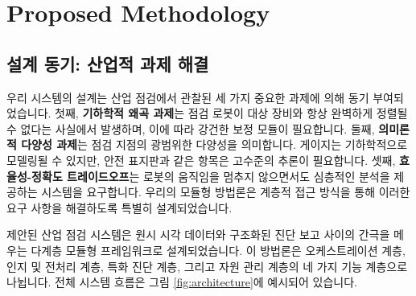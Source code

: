 \section{Proposed Methodology}
\label{sec:methodology}

\subsection{설계 동기: 산업적 과제 해결}
우리 시스템의 설계는 산업 점검에서 관찰된 세 가지 중요한 과제에 의해 동기 부여되었습니다.
첫째, \textbf{기하학적 왜곡 과제}는 점검 로봇이 대상 장비와 항상 완벽하게 정렬될 수 없다는 사실에서 발생하며, 이에 따라 강건한 보정 모듈이 필요합니다.
둘째, \textbf{의미론적 다양성 과제}는 점검 지점의 광범위한 다양성을 의미합니다. 게이지는 기하학적으로 모델링될 수 있지만, 안전 표지판과 같은 항목은 고수준의 추론이 필요합니다.
셋째, \textbf{효율성-정확도 트레이드오프}는 로봇의 움직임을 멈추지 않으면서도 심층적인 분석을 제공하는 시스템을 요구합니다.
우리의 모듈형 방법론은 계층적 접근 방식을 통해 이러한 요구 사항을 해결하도록 특별히 설계되었습니다.

제안된 산업 점검 시스템은 원시 시각 데이터와 구조화된 진단 보고 사이의 간극을 메우는 다계층 모듈형 프레임워크로 설계되었습니다.
이 방법론은 오케스트레이션 계층, 인지 및 전처리 계층, 특화 진단 계층, 그리고 자원 관리 계층의 네 가지 기능 계층으로 나뉩니다.
전체 시스템 흐름은 그림 \ref{fig:architecture}에 예시되어 있습니다.

